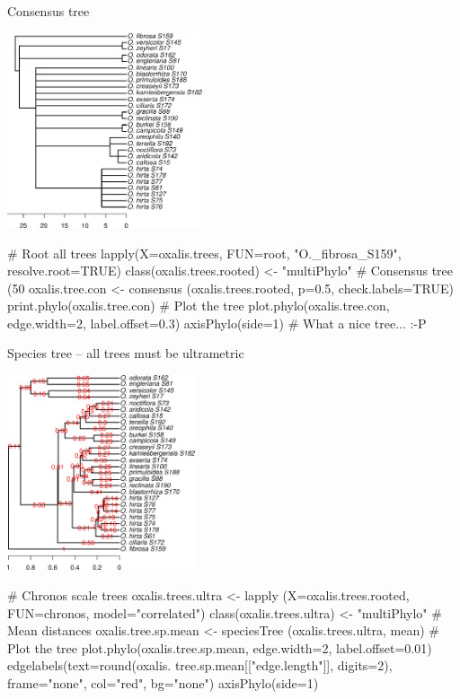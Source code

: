 \documentclass[compress, ucs, xelatex, 11pt, xcolor=svgnames,
  hyperref={
    bookmarks=true,
    unicode=true,
    colorlinks=true,
    pdftitle={Molecular data in R},
    plainpages=false,
    pdfauthor={Vojtech Zeisek},
    pdfsubject={Course about phylogeny and evolution in R},
    pdfcreator={XeLaTeX},
    pdfkeywords={R, evolution, phylogeny, molecular data},
    linkcolor=Tomato,
    anchorcolor=SaddleBrown,
    citecolor=Goldenrod,
    filecolor=DarkMagenta,
    menucolor=Sienna,
    urlcolor=DarkTurquoise,
    pdftex},
  url={hyphens, lowtilde} %
  ]{beamer}
\begin{document}
\begin{frame}[fragile]{Consensus tree}
\begin{multicols}{2}
  \begin{center}
    \includegraphics[height=5.75cm]{oxalis-cons.png}
  \end{center}
  \begin{spluscode}
    # Root all trees
    lapply(X=oxalis.trees, FUN=root,
      "O._fibrosa_S159",
      resolve.root=TRUE)
    class(oxalis.trees.rooted) <-
      "multiPhylo"
    # Consensus tree (50 %
    oxalis.tree.con <- consensus
      (oxalis.trees.rooted, p=0.5,
      check.labels=TRUE)
    print.phylo(oxalis.tree.con)
    # Plot the tree
    plot.phylo(oxalis.tree.con,
      edge.width=2, label.offset=0.3)
    axisPhylo(side=1)
    # What a nice tree... :-P
  \end{spluscode}
\end{multicols}
\end{frame}

\begin{frame}[fragile]{Species tree -- all trees must be ultrametric}
\begin{multicols}{2}
  \begin{center}
    \includegraphics[height=5.75cm]{oxalis-sp.png}
  \end{center}
  \begin{spluscode}
    # Chronos scale trees
    oxalis.trees.ultra <- lapply
      (X=oxalis.trees.rooted,
      FUN=chronos, model="correlated")
    class(oxalis.trees.ultra) <-
      "multiPhylo"
    # Mean distances
    oxalis.tree.sp.mean <- speciesTree
      (oxalis.trees.ultra, mean)
    # Plot the tree
    plot.phylo(oxalis.tree.sp.mean,
      edge.width=2, label.offset=0.01)
    edgelabels(text=round(oxalis.
      tree.sp.mean[["edge.length"]],
      digits=2), frame="none",
      col="red", bg="none")
    axisPhylo(side=1)
  \end{spluscode}
\end{multicols}
\end{frame}
\end{document}
